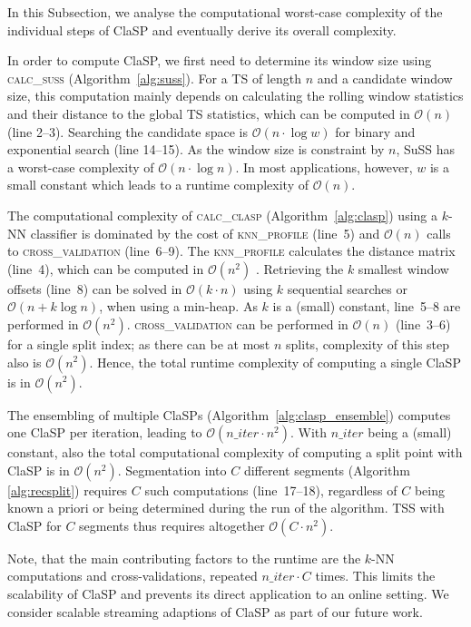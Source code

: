 \documentclass[pdflatex,sn-basic]{sn-jnl}
\begin{document}
In this Subsection, we analyse the computational worst-case complexity of the individual steps of ClaSP and eventually derive its overall complexity. 

In order to compute ClaSP, we first need to determine its window size using \textsc{calc\_suss} (Algorithm~\ref{alg:suss}). For a TS of length $n$ and a candidate window size, this computation mainly depends on calculating the rolling window statistics and their distance to the global TS statistics, which can be computed in $\mathcal{O}(n)$ (line 2--3). Searching the candidate space is $\mathcal{O}(n \cdot \log w)$ for binary and exponential search (line 14--15). As the window size is constraint by $n$, SuSS has a worst-case complexity of $\mathcal{O}(n \cdot \log n)$. In most applications, however, $w$ is a small constant which leads to a runtime complexity of $\mathcal{O}(n)$.

The computational complexity of \textsc{calc\_clasp} (Algorithm~\ref{alg:clasp}) using a $k$-NN classifier is dominated by the cost of \textsc{knn\_profile} (line~5) and $\mathcal{O}(n)$ calls to \textsc{cross\_validation} (line~6--9). The \textsc{knn\_profile} calculates the distance matrix (line~4), which can be computed in $\mathcal{O}(n^2)$ \citep{dokmanic2015euclidean, zhu2018matrix}. Retrieving the $k$ smallest window offsets (line~8) can be solved in $\mathcal{O}(k \cdot n)$ using $k$ sequential searches or $\mathcal{O}(n + k \log n)$, when using a min-heap. As $k$ is a (small) constant, line~5--8 are performed in $\mathcal{O}(n^2)$. \textsc{cross\_validation} can be performed in $\mathcal{O}(n)$ (line~3--6) for a single split index; as there can be at most $n$ splits, complexity of this step also is $\mathcal{O}(n^2)$. Hence, the total runtime complexity of computing a single ClaSP is in $\mathcal{O}(n^2)$. 

The ensembling of multiple ClaSPs (Algorithm~\ref{alg:clasp_ensemble}) computes one ClaSP per iteration, leading to $\mathcal{O}(n\_iter \cdot n^2)$. With $n\_iter$ being a (small) constant, also the total computational complexity of computing a split point with ClaSP is in $\mathcal{O}(n^2)$. Segmentation into $C$ different segments (Algorithm \ref{alg:recsplit}) requires $C$ such computations (line~17--18), regardless of $C$ being known a priori or being determined during the run of the algorithm. TSS with ClaSP for $C$ segments thus requires altogether $\mathcal{O}(C \cdot n^2)$. 

Note, that the main contributing factors to the runtime are the $k$-NN computations and cross-validations, repeated $n\_iter \cdot C$ times. This limits the scalability of ClaSP and prevents its direct application to an online setting. We consider scalable streaming adaptions of ClaSP as part of our future work. 
\end{document}
